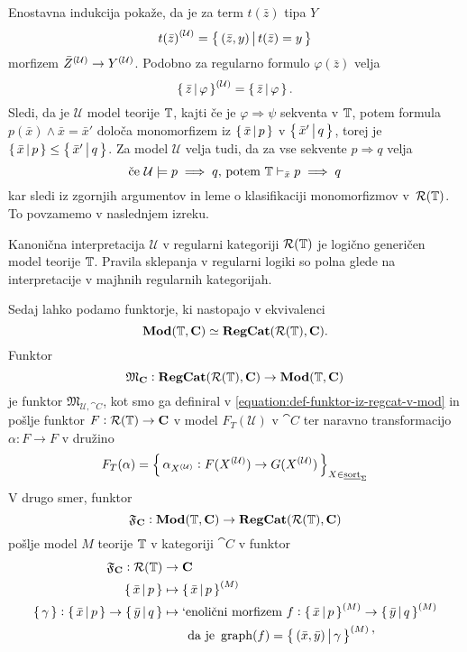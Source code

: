 \documentclass[../kategoricna_logika.tex]{subfiles}
\begin{document}
Enostavna indukcija pokaže, da je za term $t(\bar{z})$ tipa $Y$
$${t(\bar{z})}^{(\mathcal{U})} = \left\lbrace\,(\bar{z},y)\,\middle|\, t(\bar{z}) = y\,\right\rbrace$$
morfizem ${\bar{Z}}^{(\mathcal{U})} \to {Y}^{(\mathcal{U})}$. Podobno za regularno
formulo $\varphi(\bar{z})$ velja
$${\left\lbrace\,\bar{z}\,\middle|\, \varphi\,\right\rbrace}^{(\mathcal{U})} = \left\lbrace\,\bar{z}\,\middle|\, \varphi\,\right\rbrace.$$
Sledi, da je $\mathcal{U}$ model teorije $\mathbb{T}$, kajti če je
$\varphi \Rightarrow \psi$ sekventa v $\mathbb{T}$, potem formula
$p(\bar{x}) \wedge \bar{x}= \bar{x}'$ določa monomorfizem iz
$\left\lbrace\,\bar{x}\,\middle|\, p\,\right\rbrace$ v $\left\lbrace\,\bar{x}'\,\middle|\, q\,\right\rbrace$, torej
je $\left\lbrace\,\bar{x}\,\middle|\, p\,\right\rbrace \leq \left\lbrace\,\bar{x}'\,\middle|\, q\,\right\rbrace$.
Za model $\mathcal{U}$ velja tudi, da za vse sekvente
$p \Rightarrow q$ velja
$$\text{če} \ \mathcal{U} \models p \implies q \text{, potem} \ \mathbb{T} \vdash_{\bar{x}} p \implies q$$
kar sledi iz zgornjih argumentov in leme o klasifikaciji monomorfizmov
v~$\mathcal{R}(\mathbb{T})$.  To povzamemo v naslednjem izreku.
\begin{izrek}
  Kanonična interpretacija $\mathcal{U}$ v regularni kategoriji
  $\mathcal{R}(\mathbb{T})$ je logično generičen model teorije $\mathbb{T}$. Pravila
  sklepanja v regularni logiki so polna glede na interpretacije v
  majhnih regularnih kategorijah.
\end{izrek}
Sedaj lahko podamo funktorje, ki nastopajo v ekvivalenci
$$\mathbf{Mod}(\mathbb{T}, {\operatorname{\mathbf{C}}}) \simeq {\operatorname{\mathbf{RegCat}}}(\mathcal{R}(\mathbb{T}), {\operatorname{\mathbf{C}}}).$$
Funktor
$$\mathfrak{M}_{{\operatorname{\mathbf{C}}}} : {\operatorname{\mathbf{RegCat}}}(\mathcal{R}(\mathbb{T}), {\operatorname{\mathbf{C}}}) \to \mathbf{Mod}(\mathbb{T}, {\operatorname{\mathbf{C}}})$$
je funktor $\mathfrak{M}_{\mathcal{U}, \cat{C}}$, kot smo ga definiral
v \eqref{equation:def-funktor-iz-regcat-v-mod} in pošlje funktor
$F : \mathcal{R}(\mathbb{T}) \to {\operatorname{\mathbf{C}}}$ v model $F_T(\mathcal{U})$ v
$\cat{C}$ ter naravno transformacijo $\alpha : F \to F$ v družino
$$F_T(\alpha) = \left\lbrace\,\alpha_{{X}^{(\mathcal{U})}} : F({X}^{(\mathcal{U})}) \to G({X}^{(\mathcal{U})})\,\right\rbrace_{X \in \underline{\mathrm{sort}}_{\Sigma}}$$
V drugo smer, funktor
$$\mathfrak{F}_{{\operatorname{\mathbf{C}}}} : \mathbf{Mod}(\mathbb{T}, {\operatorname{\mathbf{C}}}) \to {\operatorname{\mathbf{RegCat}}}(\mathcal{R}(\mathbb{T}), {\operatorname{\mathbf{C}}})$$
pošlje model $M$ teorije $\mathbb{T}$ v kategoriji $\cat{C}$ v funktor
\begin{align*}
  \mathfrak{F}_{\cat{C}} : \mathcal{R}(\T) &\to \cat{C}\\
  \set{\bar{x}\,\middle|\, p} &\mapsto \set{\bar{x}\,\middle|\, p}^{(M)} \\
  \set{\gamma} : \set{\bar{x}\,\middle|\, p} \to \set{\bar{y}\,\middle|\, q} &\mapsto \text{`enolični morfizem} \ f : \set{\bar{x}\,\middle|\, p}^{(M)} \to \set{\bar{y}\,\middle|\, q}^{(M)} \\ 
                                           &\qquad \text{da je} \ \graf(f) = \set{(\bar{x}, \bar{y}) \,\middle|\, \gamma}^{(M)} \text{'}
\end{align*}
\end{document}
